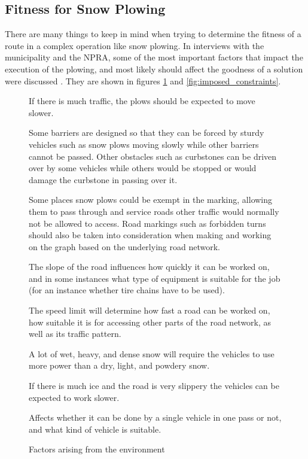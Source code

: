 
\subsection{Fitness for Snow Plowing} %
\label{sub:fitness_for_snow_plowing}

There are many things to keep in mind when trying to determine the fitness of a route in a complex operation like snow plowing. In interviews with the municipality and the NPRA, some of the most important factors that impact the execution of the plowing, and most likely should affect the goodness of a solution were discussed \citep{meetingBigOneInTheFall}. They are shown in figures \ref{fig:environmental_factors} and \ref{fig:imposed_constraints}.


\begin{figure}[thbp]
\caption{Factors arising from the environment}
\label{fig:environmental_factors}
\begin{description}
    \item [Amount of traffic.] If there is much traffic, the plows should be expected to move slower.
    \item [Obstacles such as barriers and curbstones.] Some barriers are designed so that they can be forced by sturdy vehicles such as snow plows moving slowly while other barriers cannot be passed. Other obstacles such as curbstones can be driven over by some vehicles while others would be stopped or would damage the curbstone in passing over it.
    \item [Road marking and regulation.] Some places snow plows could be exempt in the marking, allowing them to pass through and service roads other traffic would normally not be allowed to access. Road markings such as forbidden turns should also be taken into consideration when making and working on the graph based on the underlying road network.
    \item [Slope of the road.] The slope of the road influences how quickly it can be worked on, and in some instances what type of equipment is suitable for the job (for an instance whether tire chains have to be used).
    \item [Speed limit.] The speed limit will determine how fast a road can be worked on, how suitable it is for accessing other parts of the road network, as well as its traffic pattern.
    \item [Weather -- Quality of the snow.] A lot of wet, heavy, and dense snow will require the vehicles to use more power than a dry, light, and powdery snow.
    \item [Weather -- Slipperiness of the road.] If there is much ice and the road is very slippery the vehicles can be expected to work slower.
    \item [Width of the road.] Affects whether it can be done by a single vehicle in one pass or not, and what kind of vehicle is suitable.
\end{description}
\end{figure}

